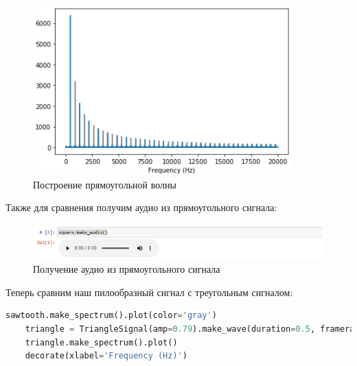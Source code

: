 \documentclass[a4paper]{article}
\begin{document}
            \begin{figure}[H]
                \centering
                \includegraphics[width=\textwidth]{ex_2_compare_square.png}
                \caption{Построение прямоугольной волны}
                \label{fig:compare_square}
            \end{figure}
            
            Также для сравнения получим аудио из прямоугольного сигнала:
            
            \begin{figure}[H]
                \centering
                \includegraphics[width=\textwidth]{ex_2_compare_square_audio.png}
                \caption{Получение аудио из прямоугольного сигнала}
                \label{fig:compare_square_audio}
            \end{figure}
            
            Теперь сравним наш пилообразный сигнал с треугольным сигналом:
            
\begin{lstlisting}[language=Python, caption= Построение треугольной волны]
    sawtooth.make_spectrum().plot(color='gray')
    triangle = TriangleSignal(amp=0.79).make_wave(duration=0.5, framerate=40000)
    triangle.make_spectrum().plot()
    decorate(xlabel='Frequency (Hz)')
\end{lstlisting}               
            
\end{document}
